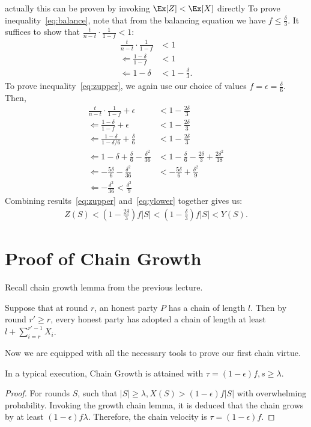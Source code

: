 {\color{red} actually this can be proven by invoking $\Ex[Z] < \Ex[X]$ directly}
To prove inequality~\ref{eq:balance}, note that from the balancing equation we have $f \leq \frac{\delta}{3}$. It suffices to show that $\frac{t}{n-t}\cdot\frac{1}{1-f} < 1$:
\begin{align}
\frac{t}{n-t}\cdot\frac{1}{1-f} &< 1\\
\Leftarrow \frac{1-\delta}{1-f} &< 1\\
\Leftarrow 1-\delta &< 1 -\frac{\delta}{3}.
\end{align}
To prove inequality~\ref{eq:zupper}, we again use our choice of values $f = \epsilon = \frac{\delta}{6}$. Then,
\begin{align}
    \frac{t}{n-t}\cdot\frac{1}{1-f} + \epsilon &< 1 - \frac{2\delta}{3}\\
    \Leftarrow \frac{1-\delta}{1-f} + \epsilon &< 1-\frac{2\delta}{3}\\
    \Leftarrow \frac{1-\delta}{1-\delta/6} + \frac{\delta}{6} &< 1 - \frac{2\delta}{3}\\
    \Leftarrow 1-\delta + \frac{\delta}{6} -\frac{\delta^2}{36} &< 1- \frac{\delta}{6} -\frac{2\delta}{3} + \frac{2\delta^2}{18}\\
    \Leftarrow -\frac{5\delta}{6}-\frac{\delta^2}{36} &< -\frac{5\delta}{6} + \frac{\delta^2}{9}\\
    \Leftarrow -\frac{\delta^2}{36} < \frac{\delta^2}{9}
\end{align}
Combining results~\ref{eq:zupper} and~\ref{eq:ylower} together gives us:
\begin{align}
Z(S) < \left(1 - \frac{2\delta}{3}\right)f|S| <  \left(1 - \frac{\delta}{3}\right)f|S| <
Y(S).
\end{align}

\section{Proof of Chain Growth}
Recall chain growth lemma from the previous lecture.
\begin {lemma}
    Suppose that at round $r$, an honest party $P$ has a chain of length $l$. Then by round $r' \geq r$, every honest party has adopted a chain of length at least $l + \sum_{i=r}^{r'-1} X_i$.
\end {lemma}
Now we are equipped with all the necessary tools to prove our first chain virtue.

\begin{theorem}\label{thm:chain-growth}
In a typical execution, Chain Growth is attained with $\tau = (1-\epsilon)f, s \geq \lambda$.
\end{theorem}
\begin{proof}
For rounds $S$, such that $|S| \geq \lambda, X(S) > (1-\epsilon)f|S|$ with overwhelming probability. Invoking the growth chain lemma, it is deduced that the chain grows by at least $(1-\epsilon)f\lambda$. Therefore, the chain velocity is $\tau = (1-\epsilon)f$.
\end{proof}



